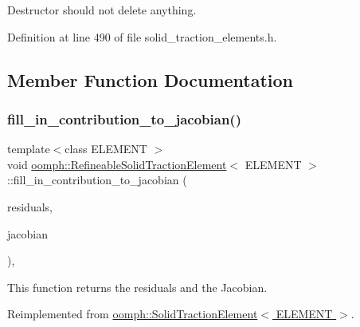 Destructor should not delete anything. 



Definition at line 490 of file solid\+\_\+traction\+\_\+elements.\+h.



\subsection{Member Function Documentation}
\mbox{\label{classoomph_1_1RefineableSolidTractionElement_ad1921c9d88c2d71c0f3735259faaef35}} 
\subsubsection{\texorpdfstring{fill\+\_\+in\+\_\+contribution\+\_\+to\+\_\+jacobian()}{fill\_in\_contribution\_to\_jacobian()}}
{\footnotesize\ttfamily template$<$class E\+L\+E\+M\+E\+NT $>$ \\
void \hyperlink{classoomph_1_1RefineableSolidTractionElement}{oomph\+::\+Refineable\+Solid\+Traction\+Element}$<$ E\+L\+E\+M\+E\+NT $>$\+::fill\+\_\+in\+\_\+contribution\+\_\+to\+\_\+jacobian (\begin{DoxyParamCaption}\item[{\hyperlink{classoomph_1_1Vector}{Vector}$<$ double $>$ \&}]{residuals,  }\item[{\hyperlink{classoomph_1_1DenseMatrix}{Dense\+Matrix}$<$ double $>$ \&}]{jacobian }\end{DoxyParamCaption})\hspace{0.3cm}{\ttfamily [inline]}, {\ttfamily [virtual]}}



This function returns the residuals and the Jacobian. 



Reimplemented from \hyperlink{classoomph_1_1SolidTractionElement_a7f6315287b8d863631a06b75e0cc7daf}{oomph\+::\+Solid\+Traction\+Element$<$ E\+L\+E\+M\+E\+N\+T $>$}.



